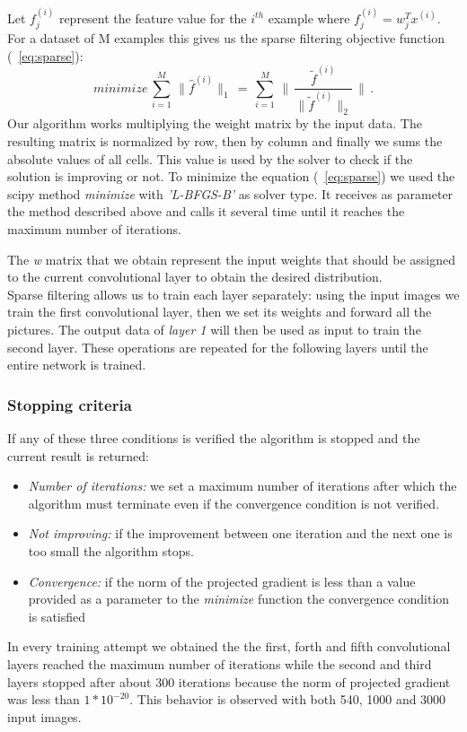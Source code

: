 Let \textit{\(f^{(i)}_{j}\)} represent the feature value for the \textit{\(i^{th}\)} example where \textbf{\textit{\(f^{(i)}_{j} = w_{j}^{T}x^{(i)}\)}}. For a dataset of M examples this gives us the sparse filtering objective function (~\ref{eq:sparse}):
\begin{equation}\label{eq:sparse}
minimize\,\sum_{i=1}^{M}\, \lVert \hat{f}^{(i)} \rVert _1\, =\, \sum_{i=1}^{M}\,\Bigg\|\,\frac{\tilde{f}^{(i)}}{\lVert\tilde{f}^{(i)}\rVert_2}\,\Bigg\| \,.
\end{equation}
Our algorithm works multiplying the weight matrix by the input data. The resulting matrix is normalized by row, then by column and finally we sums the absolute values of all cells. This value is used by the solver to check if the solution is improving or not.
To minimize the equation (~\ref{eq:sparse}) we used the scipy method \textit{minimize} with \textit{'L-BFGS-B'} as solver type. It receives as parameter the method described above and calls it several time until it reaches the maximum number of iterations.

The \textit{w} matrix that we obtain represent the input weights that should be assigned to the current convolutional layer to obtain the desired distribution.\\

Sparse filtering allows us to train each layer separately: using the input images we train the first convolutional layer, then we set its weights and forward all the pictures. The output data of \textit{layer 1} will then be used as input to train the second layer. These operations are repeated for the following layers until the entire network is trained. 

\subsubsection{Stopping criteria}

If any of these three conditions is verified the algorithm is stopped and the current result is returned:
\begin{itemize}
\item \textit{Number of iterations:} we set a maximum number of iterations after which the algorithm must terminate even if the convergence condition is not verified.
\item \textit{Not improving:} if the improvement between one iteration and the next one is too small the algorithm stops.
\item \textit{Convergence:} if the norm of the projected gradient is less than a value provided as a parameter to the \textit{minimize} function the convergence condition is satisfied
\end{itemize}
In every training attempt we obtained the the first, forth and fifth convolutional layers reached the maximum number of iterations while the second and third layers stopped after about 300 iterations because the norm of projected gradient was less than \(1*10^{-20}\). This behavior is observed with both 540, 1000 and 3000 input images.


